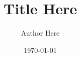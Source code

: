 \title{Title Here}
\newcommand{\thesubtitle}{Subtitle Here}
\author{Author Here}
\date{\today}
\newcommand{\tripos}{Tripos \& Part Here}
\newcommand{\degree}{Bachelor of Arts}
\newcommand{\university}{University of Cambridge}
\newcommand{\college}{College Here}
\newcommand{\supervisors}{Supervisor 1, Supervisor 2}
\newcommand{\candidatenumber}{Candidate Number Here}
\newcommand{\submissiondeadline}{MM/YYYY Submission Month Deadline Here}
\newcommand{\projectoriginator}{Project Originator Here}